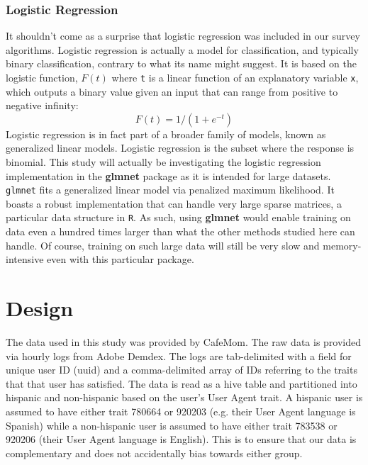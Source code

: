 \documentclass[twoside]{article}
\begin{document}
\begin{multicols}{2}
\subsubsection{Logistic Regression}
It shouldn't come as a surprise that logistic regression was included in our survey algorithms. Logistic regression is actually a model for classification, and typically binary classification, contrary to what its name might suggest\cite{30}. It is based on the logistic function, \(F(t)\) where \texttt{t} is a linear function of an explanatory variable \texttt{x}, which outputs a binary value given an input that can range from positive to negative infinity\cite{10}:
\[ F(t) = 1/(1 + e^{-t}) \]
Logistic regression is in fact part of a broader family of models, known as generalized linear models. Logistic regression is the subset where the response is binomial\cite{32}. This study will actually be investigating the logistic regression implementation in the \textbf{glmnet} package as it is intended for large datasets. \texttt{glmnet} fits a generalized linear model via penalized maximum likelihood\cite{4}. It boasts a robust implementation that can handle very large sparse matrices\cite{6}, a particular data structure in \texttt{R}. As such, using \textbf{glmnet} would enable training on data even a hundred times larger than what the other methods studied here can handle. Of course, training on such large data will still be very slow and memory-intensive even with this particular package.


\section{Design}

The data used in this study was provided by CafeMom. The raw data is provided via hourly logs from Adobe Demdex. The logs are tab-delimited with a field for unique user ID (uuid) and a comma-delimited array of IDs referring to the traits that that user has satisfied. The data is read as a hive table and partitioned into hispanic and non-hispanic based on the user's User Agent trait. A hispanic user is assumed to have either trait 780664 or 920203 (e.g. their User Agent language is Spanish) while a non-hispanic user is assumed to have either trait 783538 or 920206 (their User Agent language is English). This is to ensure that our data is complementary and does not accidentally bias towards either group.


\end{multicols}
\end{document}
